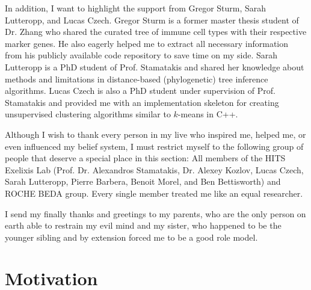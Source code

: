 \documentclass{thesisclass}
\begin{document}
\begin{addmargin}{0.5cm}
In addition, I want to highlight the support from Gregor Sturm, Sarah Lutteropp, and Lucas Czech. Gregor Sturm is a former master thesis student of Dr. Zhang who shared the curated tree of immune cell types with their respective marker genes. He also eagerly helped me to extract  all necessary information from his publicly available code repository to save time on my side. Sarah Lutteropp is a PhD student of Prof. Stamatakis and shared her knowledge about methods and limitations in distance-based (phylogenetic) tree inference algorithms. Lucas Czech is also a PhD student under supervision of Prof. Stamatakis and provided me with an implementation skeleton for creating unsupervised clustering algorithms similar to $k$-means in C++.

Although I wish to thank every person in my live who inspired me, helped me, or even influenced my belief system, I must restrict myself to the following group of people that deserve a special place in this section: All members of the HITS Exelixis Lab (Prof. Dr. Alexandros Stamatakis, Dr. Alexey Kozlov, Lucas Czech, Sarah Lutteropp, Pierre Barbera, Benoit Morel, and Ben Bettisworth) and ROCHE BEDA group. Every single member treated me like an equal researcher.

I send my finally thanks and greetings to my parents, who are the only person on earth able to restrain my evil mind and my sister, who happened to be the younger sibling and by extension forced me to be a good role model.

\end{addmargin}

\blankpage


\tableofcontents
\listoftodos
\blankpage


\mainmatter
{}

\chapter{Motivation}
\label{ch:motivation}

\end{document}
